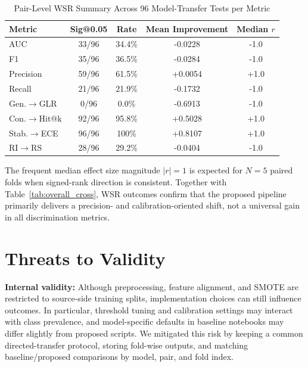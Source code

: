 \documentclass[conference]{IEEEtran}
\begin{document}
\begin{table}[t]
\caption{Pair-Level WSR Summary Across 96 Model-Transfer Tests per Metric}
\label{tab:wsr_cross_summary}
\centering
\footnotesize
\setlength{\tabcolsep}{3.7pt}
\renewcommand{\arraystretch}{1.10}
\begin{tabular}{|l|c|c|c|c|}
\hline
\textbf{Metric} & \textbf{Sig@0.05} & \textbf{Rate} & \textbf{Mean Improvement} & \textbf{Median \(r\)} \\
\hline
AUC & 33/96 & 34.4\% & -0.0228 & -1.0 \\
\hline
F1 & 35/96 & 36.5\% & -0.0284 & -1.0 \\
\hline
Precision & 59/96 & 61.5\% & +0.0054 & +1.0 \\
\hline
Recall & 21/96 & 21.9\% & -0.1732 & -1.0 \\
\hline
Gen.\(\rightarrow\)GLR & 0/96 & 0.0\% & -0.6913 & -1.0 \\
\hline
Con.\(\rightarrow\)Hit@k & 92/96 & 95.8\% & +0.5028 & +1.0 \\
\hline
Stab.\(\rightarrow\)ECE & 96/96 & 100\% & +0.8107 & +1.0 \\
\hline
RI\(\rightarrow\)RS & 28/96 & 29.2\% & -0.0404 & -1.0 \\
\hline
\end{tabular}
\renewcommand{\arraystretch}{1.0}
\normalsize
\end{table}

The frequent median effect size magnitude \(|r|=1\) is expected for \(N=5\) paired folds when signed-rank direction is consistent. Together with Table~\ref{tab:overall_cross}, WSR outcomes confirm that the proposed pipeline primarily delivers a precision- and calibration-oriented shift, not a universal gain in all discrimination metrics.

\section{Threats to Validity}
\textbf{Internal validity:} Although preprocessing, feature alignment, and SMOTE are restricted to source-side training splits, implementation choices can still influence outcomes. In particular, threshold tuning and calibration settings may interact with class prevalence, and model-specific defaults in baseline notebooks may differ slightly from proposed scripts. We mitigated this risk by keeping a common directed-transfer protocol, storing fold-wise outputs, and matching baseline/proposed comparisons by model, pair, and fold index.
\end{document}
